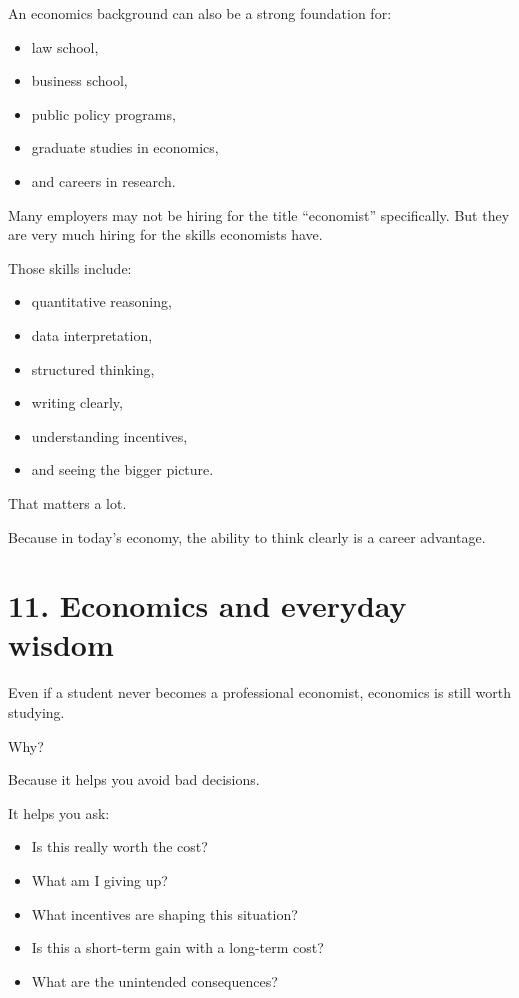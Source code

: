 \documentclass[12pt]{article}
\begin{document}
An economics background can also be a strong foundation for:
\begin{itemize}[leftmargin=2em]
    \item law school,
    \item business school,
    \item public policy programs,
    \item graduate studies in economics,
    \item and careers in research.
\end{itemize}

Many employers may not be hiring for the title ``economist'' specifically.  
But they are very much hiring for the skills economists have.

Those skills include:
\begin{itemize}[leftmargin=2em]
    \item quantitative reasoning,
    \item data interpretation,
    \item structured thinking,
    \item writing clearly,
    \item understanding incentives,
    \item and seeing the bigger picture.
\end{itemize}

That matters a lot.

Because in today’s economy, the ability to think clearly is a career advantage.

\section*{11. Economics and everyday wisdom}

Even if a student never becomes a professional economist, economics is still worth studying.

Why?

Because it helps you avoid bad decisions.

It helps you ask:
\begin{itemize}[leftmargin=2em]
    \item Is this really worth the cost?
    \item What am I giving up?
    \item What incentives are shaping this situation?
    \item Is this a short-term gain with a long-term cost?
    \item What are the unintended consequences?
\end{itemize}
\end{document}
